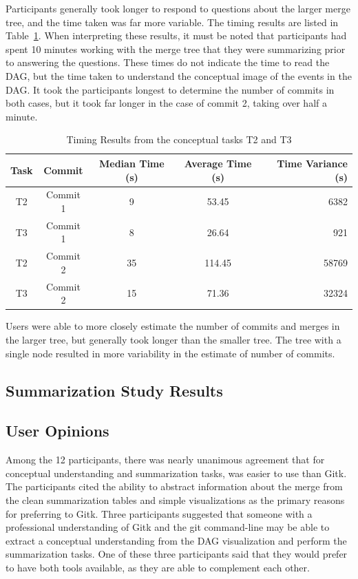 Participants generally took longer to respond to questions about the
larger merge tree, and the time taken was far more variable. The timing
results are listed in Table~\ref{tab:conceptual_time_results}. When
interpreting these results, it must be noted that participants had spent
10 minutes working with the merge tree that they were summarizing prior
to answering the questions. These times do not indicate the time to read
the DAG, but the time taken to understand the conceptual image of the
events in the DAG. It took the participants longest to determine the
number of commits in both cases, but it took far longer in the case of
commit 2, taking over half a minute.

\begin{table}[htpb]
  \centering
  \caption{Timing Results from the conceptual tasks T2 and T3}
  \label{tab:conceptual_time_results}
  \begin{tabular}{ccccr}
    \toprule
    Task & Commit   & Median Time (s) & Average Time (s) & Time Variance (s)\\\midrule
    T2   & Commit 1 & 9               & 53.45            & 6382\\
    T3   & Commit 1 & 8               & 26.64            & 921\\
    T2   & Commit 2 & 35              & 114.45           & 58769\\
    T3   & Commit 2 & 15              & 71.36            & 32324\\
    \bottomrule
  \end{tabular}
\end{table}

Users were able to more closely estimate the number of commits and
merges in the larger tree, but generally took longer than the smaller
tree. The tree with a single node resulted in more variability in the
estimate of number of commits.

\subsection{Summarization Study Results}
\label{sub:summarization_results}

\subsection{User Opinions}
\label{sub:user_opinions_results}

Among the 12 participants, there was nearly unanimous agreement that for
conceptual understanding and summarization tasks, \tool{} was easier to
use than Gitk. The participants cited the ability to abstract
information about the merge from the clean summarization tables and
simple visualizations as the primary reasons for preferring \tool{} to
Gitk. Three participants suggested that someone with a professional
understanding of Gitk and the git command-line may be able to extract a
conceptual understanding from the DAG visualization and perform the
summarization tasks. One of these three participants said that they
would prefer to have both tools available, as they are able to
complement each other.
